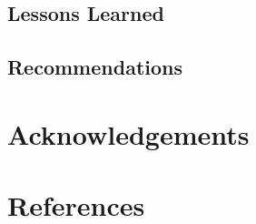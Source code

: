 \documentclass[a4paper,12pt,twoside]{article}
\begin{document}
    \begin{multicols}{2}
    \lipsum[0-5]
    \end{multicols}

\subsection{Lessons Learned}

    \begin{multicols}{2}
    \lipsum[0-5]
    \end{multicols}
    
\subsection{Recommendations}

    \begin{multicols}{2}
    \lipsum[0-5]
    \end{multicols}

\section{Acknowledgements}

    \begin{multicols}{2}
    \lipsum[0-5]
    \end{multicols}

\section{References}

    \begin{multicols}{2}
    \lipsum[0-5]
    \end{multicols}
\end{document}
